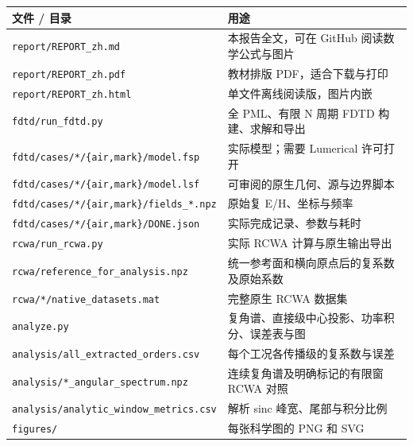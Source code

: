 \documentclass[
  chinese,
  UTF8,
  a4paper,
  11pt]{ctexart}
\newcounter{none} %
\begin{document}
{\def\LTcaptype{none} %
\begin{longtable}[]{@{}
  >{\raggedright\arraybackslash}p{}
  >{\raggedright\arraybackslash}p{}@{}}
\toprule\noalign{}
\begin{minipage}[b]{\linewidth}\raggedright
文件 / 目录
\end{minipage} & \begin{minipage}[b]{\linewidth}\raggedright
用途
\end{minipage} \\
\midrule\noalign{}
\endhead
\bottomrule\noalign{}
\endlastfoot
\texttt{report/REPORT\_zh.md} & 本报告全文，可在 GitHub
阅读数学公式与图片 \\
\texttt{report/REPORT\_zh.pdf} & 教材排版 PDF，适合下载与打印 \\
\texttt{report/REPORT\_zh.html} & 单文件离线阅读版，图片内嵌 \\
\texttt{fdtd/run\_fdtd.py} & 全 PML、有限 N 周期 FDTD
构建、求解和导出 \\
\texttt{fdtd/cases/*/\{air,mark\}/model.fsp} & 实际模型；需要 Lumerical
许可打开 \\
\texttt{fdtd/cases/*/\{air,mark\}/model.lsf} &
可审阅的原生几何、源与边界脚本 \\
\texttt{fdtd/cases/*/\{air,mark\}/fields\_*.npz} & 原始复
E/H、坐标与频率 \\
\texttt{fdtd/cases/*/\{air,mark\}/DONE.json} &
实际完成记录、参数与耗时 \\
\texttt{rcwa/run\_rcwa.py} & 实际 RCWA 计算与原生输出导出 \\
\texttt{rcwa/reference\_for\_analysis.npz} &
统一参考面和横向原点后的复系数及原始系数 \\
\texttt{rcwa/*/native\_datasets.mat} & 完整原生 RCWA 数据集 \\
\texttt{analyze.py} & 复角谱、直接级中心投影、功率积分、误差表与图 \\
\texttt{analysis/all\_extracted\_orders.csv} &
每个工况各传播级的复系数与误差 \\
\texttt{analysis/*\_angular\_spectrum.npz} &
连续复角谱及明确标记的有限窗 RCWA 对照 \\
\texttt{analysis/analytic\_window\_metrics.csv} & 解析 sinc
峰宽、尾部与积分比例 \\
\texttt{figures/} & 每张科学图的 PNG 和 SVG \\
\end{longtable}
}
\end{document}
